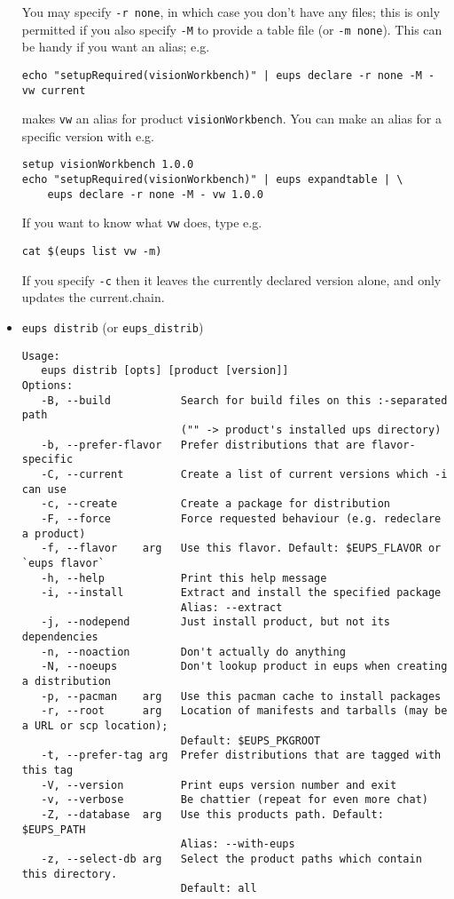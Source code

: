 \documentclass{article}
\newcommand{\code}[1]{\texttt{#1}}
\begin{document}
\begin{itemize}
You may specify \code{-r none}, in which case you don't have any files; this
is only permitted if you also specify \code{-M} to provide a table file (or \code{-m none}).
This can be handy if you want an alias; e.g.
\begin{verbatim}
echo "setupRequired(visionWorkbench)" | eups declare -r none -M - vw current
\end{verbatim}
makes \code{vw} an alias for product \code{visionWorkbench}. You can make
an alias for a specific version with e.g.
\begin{verbatim}
setup visionWorkbench 1.0.0
echo "setupRequired(visionWorkbench)" | eups expandtable | \
	eups declare -r none -M - vw 1.0.0
\end{verbatim}

If you want to
know what \code{vw} does, type e.g.
\begin{verbatim}
cat $(eups list vw -m)
\end{verbatim}				%

If you specify \code{-c} then it leaves the currently declared version alone, and
only updates the current.chain.


  \item \code{eups distrib} (or \code{eups\_distrib})
\begin{verbatim}
Usage:
   eups distrib [opts] [product [version]]
Options:
   -B, --build           Search for build files on this :-separated path
                         ("" -> product's installed ups directory)
   -b, --prefer-flavor   Prefer distributions that are flavor-specific
   -C, --current         Create a list of current versions which -i can use
   -c, --create          Create a package for distribution
   -F, --force           Force requested behaviour (e.g. redeclare a product)
   -f, --flavor    arg   Use this flavor. Default: $EUPS_FLAVOR or `eups flavor`
   -h, --help            Print this help message
   -i, --install         Extract and install the specified package
                         Alias: --extract
   -j, --nodepend        Just install product, but not its dependencies
   -n, --noaction        Don't actually do anything
   -N, --noeups          Don't lookup product in eups when creating a distribution
   -p, --pacman    arg   Use this pacman cache to install packages
   -r, --root      arg   Location of manifests and tarballs (may be a URL or scp location);
                         Default: $EUPS_PKGROOT
   -t, --prefer-tag arg  Prefer distributions that are tagged with this tag
   -V, --version         Print eups version number and exit
   -v, --verbose         Be chattier (repeat for even more chat)
   -Z, --database  arg   Use this products path. Default: $EUPS_PATH
                         Alias: --with-eups
   -z, --select-db arg   Select the product paths which contain this directory.
                         Default: all
\end{verbatim}				%


\end{itemize}
\end{document}
